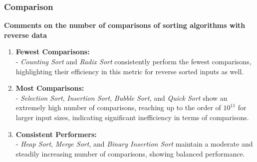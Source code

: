 \subsubsection{Comparison}

\textbf{Comments on the number of comparisons of sorting algorithms with reverse data}
\begin{enumerate}
    \item \textbf{Fewest Comparisons:} \\
- \textit{Counting Sort} and \textit{Radix Sort} consistently perform the fewest comparisons, highlighting their efficiency in this metric for reverse sorted inputs as well.

    \item \textbf{Most Comparisons:} \\
- \textit{Selection Sort}, \textit{Insertion Sort}, \textit{Bubble Sort}, and \textit{Quick Sort} show an extremely high number of comparisons, reaching up to the order of \(10^{11}\) for larger input sizes, indicating significant inefficiency in terms of comparisons.

    \item \textbf{Consistent Performers:} \\
- \textit{Heap Sort}, \textit{Merge Sort}, and \textit{Binary Insertion Sort} maintain a moderate and steadily increasing number of comparisons, showing balanced performance.
\end{enumerate}


